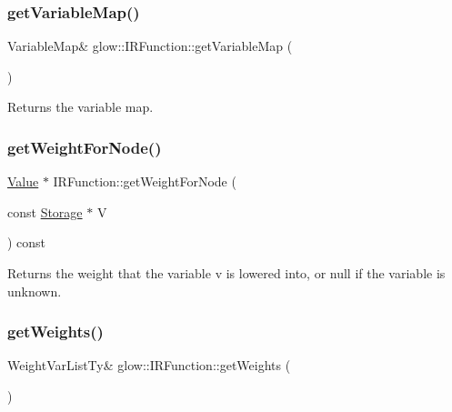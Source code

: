 \subsubsection{\texorpdfstring{get\+Variable\+Map()}{getVariableMap()}}
{\footnotesize\ttfamily Variable\+Map\& glow\+::\+I\+R\+Function\+::get\+Variable\+Map (\begin{DoxyParamCaption}{ }\end{DoxyParamCaption})\hspace{0.3cm}{\ttfamily [inline]}}

\begin{DoxyReturn}{Returns}
the variable map. 
\end{DoxyReturn}
\mbox{\label{classglow_1_1_i_r_function_ad4d42412e7c2532d1ab2de26c632582a}} 
\subsubsection{\texorpdfstring{get\+Weight\+For\+Node()}{getWeightForNode()}}
{\footnotesize\ttfamily \hyperlink{classglow_1_1_value}{Value} $\ast$ I\+R\+Function\+::get\+Weight\+For\+Node (\begin{DoxyParamCaption}\item[{const \hyperlink{classglow_1_1_storage}{Storage} $\ast$}]{V }\end{DoxyParamCaption}) const}

\begin{DoxyReturn}{Returns}
the weight that the variable {\ttfamily v} is lowered into, or null if the variable is unknown. 
\end{DoxyReturn}
\mbox{\label{classglow_1_1_i_r_function_aecff6fd57fe2f0390545d88b3561ffcb}} 
\subsubsection{\texorpdfstring{get\+Weights()}{getWeights()}\hspace{0.1cm}{\footnotesize\ttfamily [1/2]}}
{\footnotesize\ttfamily Weight\+Var\+List\+Ty\& glow\+::\+I\+R\+Function\+::get\+Weights (\begin{DoxyParamCaption}{ }\end{DoxyParamCaption})\hspace{0.3cm}{\ttfamily [inline]}}

